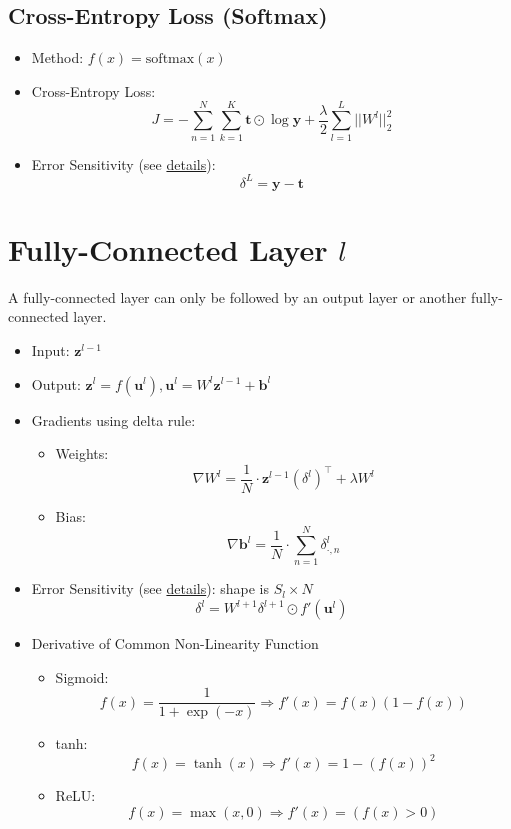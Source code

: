 \documentclass[11pt]{article}
\begin{document}
\subsection{Cross-Entropy Loss (Softmax)}
\label{sec-3-2}
\begin{itemize}
\item Method: \(f(x) = \mathrm{softmax}(x)\)
\item Cross-Entropy Loss: \[ J = - \sum_{n=1}^{N}\sum_{k=1}^{K} \mathbf{t} \odot \log\mathbf{y} + \frac{\lambda}{2} \sum_{l=1}^{L} ||W^{l}||_{2}^{2}\]
\item Error Sensitivity (see \href{http://www.cnblogs.com/tornadomeet/p/3468450.html}{details}): \[ \delta^{L} = \mathbf{y} - \mathbf{t} \]
\end{itemize}

\section{Fully-Connected Layer \(l\)}
\label{sec-4}
A fully-connected layer can only be followed by an output layer or another fully-connected layer.
\begin{itemize}
\item Input: \(\mathbf{z}^{l-1}\)
\item Output: \(\mathbf{z}^{l} = f(\mathbf{u}^{l}), \mathbf{u}^{l} = W^{l}\mathbf{z}^{l-1} + \mathbf{b}^{l}\)
\item Gradients using delta rule:
\begin{itemize}
\item Weights: \[ \nabla W^{l} = \frac{1}{N} \cdot \mathbf{z}^{l-1} (\delta^{l})^{\top}  + \lambda W^{l} \]
\item Bias: \[ \nabla \mathbf{b}^{l} = \frac{1}{N} \cdot \sum_{n=1}^{N} \delta^{l}_{\cdot, n} \]
\end{itemize}
\item Error Sensitivity (see \href{http://www.cnblogs.com/tornadomeet/p/3468450.html}{details}): shape is \(S_{l} \times N\)
  \[ \delta^{l} = W^{l+1} \delta^{l+1} \odot f'(\mathbf{u}^{l}) \]
\item Derivative of Common Non-Linearity Function
\begin{itemize}
\item Sigmoid: \[ f(x) = \frac{1}{1 + \exp{(-x)}} \Rightarrow f'(x) = f(x)(1 - f(x)) \]
\item tanh: \[ f(x) = \tanh(x) \Rightarrow f'(x) = 1 - (f(x))^2 \]
\item ReLU: \[ f(x) = \max(x, 0) \Rightarrow f'(x) = (f(x) > 0)\]
\end{itemize}
\end{itemize}
\end{document}
